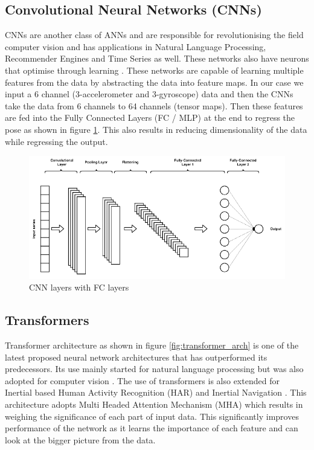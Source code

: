 \subsection{Convolutional Neural Networks (CNNs)}
CNNs are another class of ANNs and are responsible for revolutionising the field computer vision and has applications in Natural Language Processing, Recommender Engines and Time Series as well. These networks also have neurons that optimise through learning \citep{cnn2015introduction}. These networks are capable of learning multiple features from the data by abstracting the data into feature maps. In our case we input a 6 channel (3-accelerometer and 3-gyroscope) data and then the CNNs take the data from 6 channels to 64 channels (tensor maps). Then these features are fed into the Fully Connected Layers (FC / MLP) at the end to regress the pose as shown in figure \ref{fig:cnn_fc}. This also results in reducing dimensionality of the data while regressing the output. 

\begin{figure}[H]
    \centering
    \includegraphics[scale=0.4]{images/fig_chapter2/nns/cnn_mlp.png}
    \caption{CNN layers with FC layers}
    \label{fig:cnn_fc}
\end{figure}

\subsection{Transformers}
Transformer architecture as shown in figure \ref{fig:transformer_arch} is one of the latest proposed neural network architectures that has outperformed its predecessors. Its use mainly started for natural language processing \citep{vaswani2017attention} but was also adopted for computer vision \citep{dosovitskiy2020image}. The use of transformers is also extended for Inertial based Human Activity Recognition (HAR) \cite{shavit2021boosting} and Inertial Navigation \citep{rao2022ctin}. This architecture adopts Multi Headed Attention Mechanism (MHA) \citep{vaswani2017attention} which results in weighing the significance of each part of input data. This significantly improves performance of the network as it learns the importance of each feature and can look at the bigger picture from the data.

